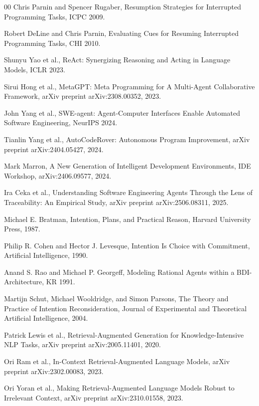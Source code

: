 \documentclass[a4paper,fleqn]{cas-dc}
\begin{document}
\begin{thebibliography}{00}
Chris Parnin and Spencer Rugaber, Resumption Strategies for Interrupted Programming Tasks, ICPC 2009.

Robert DeLine and Chris Parnin, Evaluating Cues for Resuming Interrupted Programming Tasks, CHI 2010.

Shunyu Yao et al., ReAct: Synergizing Reasoning and Acting in Language Models, ICLR 2023.

Sirui Hong et al., MetaGPT: Meta Programming for A Multi-Agent Collaborative Framework, arXiv preprint arXiv:2308.00352, 2023.

John Yang et al., SWE-agent: Agent-Computer Interfaces Enable Automated Software Engineering, NeurIPS 2024.

Tianlin Yang et al., AutoCodeRover: Autonomous Program Improvement, arXiv preprint arXiv:2404.05427, 2024.

Mark Marron, A New Generation of Intelligent Development Environments, IDE Workshop, arXiv:2406.09577, 2024.

Ira Ceka et al., Understanding Software Engineering Agents Through the Lens of Traceability: An Empirical Study, arXiv preprint arXiv:2506.08311, 2025.

Michael E. Bratman, Intention, Plans, and Practical Reason, Harvard University Press, 1987.

Philip R. Cohen and Hector J. Levesque, Intention Is Choice with Commitment, Artificial Intelligence, 1990.

Anand S. Rao and Michael P. Georgeff, Modeling Rational Agents within a BDI-Architecture, KR 1991.

Martijn Schut, Michael Wooldridge, and Simon Parsons, The Theory and Practice of Intention Reconsideration, Journal of Experimental and Theoretical Artificial Intelligence, 2004.

Patrick Lewis et al., Retrieval-Augmented Generation for Knowledge-Intensive NLP Tasks, arXiv preprint arXiv:2005.11401, 2020.

Ori Ram et al., In-Context Retrieval-Augmented Language Models, arXiv preprint arXiv:2302.00083, 2023.

Ori Yoran et al., Making Retrieval-Augmented Language Models Robust to Irrelevant Context, arXiv preprint arXiv:2310.01558, 2023.


\end{thebibliography}
\end{document}
